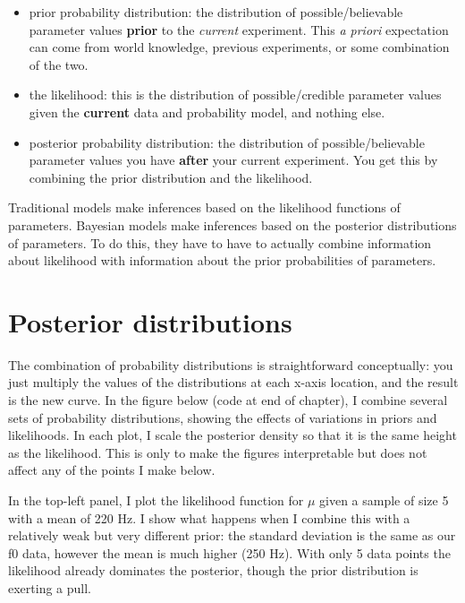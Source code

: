 \documentclass[
]{book}
\begin{document}
\begin{itemize}
\item
  prior probability distribution: the distribution of possible/believable parameter values \textbf{prior} to the \emph{current} experiment. This \emph{a priori} expectation can come from world knowledge, previous experiments, or some combination of the two.
\item
  the likelihood: this is the distribution of possible/credible parameter values given the \textbf{current} data and probability model, and nothing else.
\item
  posterior probability distribution: the distribution of possible/believable parameter values you have \textbf{after} your current experiment. You get this by combining the prior distribution and the likelihood.
\end{itemize}

Traditional models make inferences based on the likelihood functions of parameters. Bayesian models make inferences based on the posterior distributions of parameters. To do this, they have to have to actually combine information about likelihood with information about the prior probabilities of parameters.

\hypertarget{posterior-distributions}{%
\section{Posterior distributions}\label{posterior-distributions}}

The combination of probability distributions is straightforward conceptually: you just multiply the values of the distributions at each x-axis location, and the result is the new curve. In the figure below (code at end of chapter), I combine several sets of probability distributions, showing the effects of variations in priors and likelihoods. In each plot, I scale the posterior density so that it is the same height as the likelihood. This is only to make the figures interpretable but does not affect any of the points I make below.

In the top-left panel, I plot the likelihood function for \(\mu\) given a sample of size 5 with a mean of 220 Hz. I show what happens when I combine this with a relatively weak but very different prior: the standard deviation is the same as our f0 data, however the mean is much higher (250 Hz). With only 5 data points the likelihood already dominates the posterior, though the prior distribution is exerting a pull.
\end{document}
